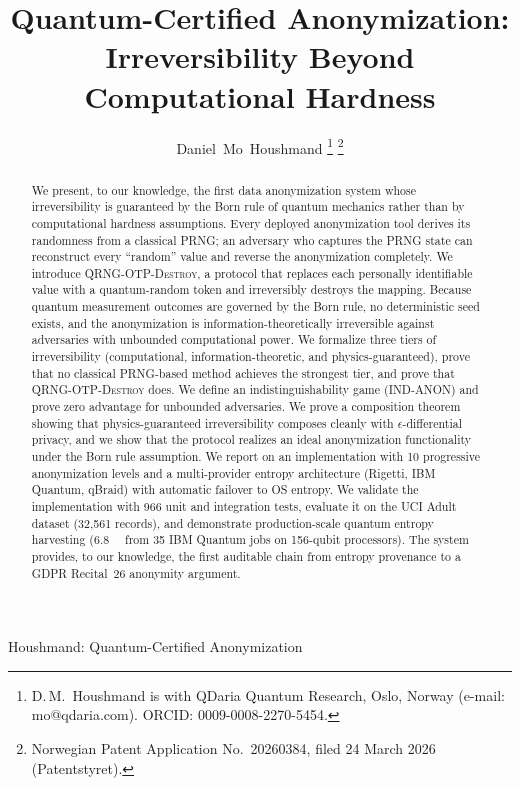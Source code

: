 \documentclass[journal]{IEEEtran}
\begin{document}
\title{Quantum-Certified Anonymization: Irreversibility Beyond Computational Hardness}

\author{Daniel~Mo~Houshmand%
\thanks{D.\,M.\ Houshmand is with QDaria Quantum Research, Oslo, Norway (e-mail: mo@qdaria.com). ORCID: 0009-0008-2270-5454.}%
\thanks{Norwegian Patent Application No.\ 20260384, filed 24 March 2026 (Patentstyret).}}

%
{Houshmand: Quantum-Certified Anonymization}

\maketitle

\begin{abstract}
We present, to our knowledge, the first data anonymization system whose irreversibility is guaranteed by the Born rule of quantum mechanics rather than by computational hardness assumptions. Every deployed anonymization tool derives its randomness from a classical PRNG; an adversary who captures the PRNG state can reconstruct every ``random'' value and reverse the anonymization completely. We introduce \textsc{QRNG-OTP-Destroy}, a protocol that replaces each personally identifiable value with a quantum-random token and irreversibly destroys the mapping. Because quantum measurement outcomes are governed by the Born rule, no deterministic seed exists, and the anonymization is information-theoretically irreversible against adversaries with unbounded computational power. We formalize three tiers of irreversibility (computational, information-theoretic, and physics-guaranteed), prove that no classical PRNG-based method achieves the strongest tier, and prove that \textsc{QRNG-OTP-Destroy} does. We define an indistinguishability game (IND-ANON) and prove zero advantage for unbounded adversaries. We prove a composition theorem showing that physics-guaranteed irreversibility composes cleanly with $\epsilon$-differential privacy, and we show that the protocol realizes an ideal anonymization functionality under the Born rule assumption. We report on an implementation with 10 progressive anonymization levels and a multi-provider entropy architecture (Rigetti, IBM Quantum, qBraid) with automatic failover to OS entropy. We validate the implementation with 966 unit and integration tests, evaluate it on the UCI Adult dataset (32,561 records), and demonstrate production-scale quantum entropy harvesting (\SI{6.8}{\mega\byte} from 35 IBM Quantum jobs on 156-qubit processors). The system provides, to our knowledge, the first auditable chain from entropy provenance to a GDPR Recital~26 anonymity argument.
\end{abstract}
\end{document}
